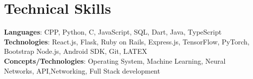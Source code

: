 \section{Technical Skills}
    \begin{itemize}[leftmargin=0.15in, label={}]
	\small{\item{
		\textbf{Languages}{: CPP, Python, C, JavaScript, SQL, Dart, Java, TypeScript} \\
		\textbf{Technologies}{: React.js, Flask, Ruby on Rails, Express.js, TensorFlow, PyTorch, Bootstrap Node.js, Android SDK, Git,  LATEX} \\
		\textbf{Concepts/Technologies}{: Operating System,  Machine Learning, Neural Networks, API,Networking, Full Stack development}
	}}
    \end{itemize}